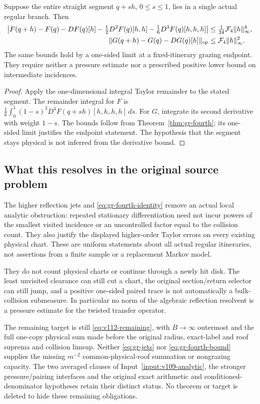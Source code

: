 \begin{corollary}
\label{cor:gr-taylor}
Suppose the entire straight segment $q+s h$, $0\le s\le1$, lies in
a single actual regular branch. Then
\begin{align}
 \left|F(q+h)-F(q)-DF(q)[h]-\tfrac12D^2F(q)[h,h]
                       -\tfrac16D^3F(q)[h,h,h]\right|
       &\le\tfrac1{24}\mathcal F_4\|h\|_\infty^4,\\
 \|G(q+h)-G(q)-DG(q)[h]\|_{\rm op}
       &\le\mathcal F_4\|h\|_\infty^2.
 \label{eq:gr-taylor}
\end{align}
The same bounds hold by a one-sided limit at a fixed-itinerary grazing
endpoint. They require neither a pressure estimate nor a prescribed
positive lower bound on intermediate incidences.
\end{corollary}
\begin{proof}
Apply the one-dimensional integral Taylor remainder to the stated
segment. The remainder integral for $F$ is
$\frac16\int_0^1(1-s)^3D^4F(q+sh)[h,h,h,h]\,ds$.
For $G$, integrate its second derivative with weight $1-s$.
The bounds follow from Theorem~\ref{thm:gr-fourth}; its one-sided
limit justifies the endpoint statement. The hypothesis that the
segment stays physical is not inferred from the derivative bound.
\end{proof}

\subsection{What this resolves in the original source problem}
The higher reflection jets and \eqref{eq:gr-fourth-identity} remove an
actual local analytic obstruction: repeated stationary differentiation
need not incur powers of the smallest visited incidence or an uncontrolled
factor equal to the collision count. They also justify the displayed
higher-order Taylor errors on every existing physical chart. These are
uniform statements about all actual regular itineraries, not assertions
from a finite sample or a replacement Markov model.

They do not count physical charts or continue through a newly hit disk.
The least unvisited clearance can still cut a chart, the original
section/return selector can still jump, and a positive one-sided paired
trace is not automatically a bulk-collision submeasure. In particular
no norm of the algebraic reflection resolvent is a pressure estimate
for the twisted transfer operator.

The remaining target is still \eqref{eq:v112-remaining}, with
$B\to\infty$ outermost and the full one-copy physical sum made before
the original radius, exact-label and roof suprema and collision limsup.
Neither \eqref{eq:gr-jets} nor \eqref{eq:gr-fourth-bound} supplies the
missing $m^{-2}$ common-physical-roof summation or nongrazing capacity.
The two averaged clauses of Input~\ref{input:v109-analytic}, the
stronger pressure/pairing interfaces and the original exact arithmetic
and conditioned-denominator hypotheses retain their distinct status.
No theorem or target is deleted to hide these remaining obligations.
